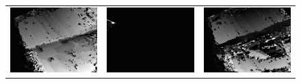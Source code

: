 \documentclass[11pt]{report}
\begin{document}
\begin{figure}[H]
\begin{tabular}{ccc}
    \includegraphics[scale=0.1]{images/disparity-opencv-t/disparity_3.png} &
    \includegraphics[scale=0.1]{images/disparity-opencv-d/disparity_3.png} &
    \includegraphics[scale=0.1]{images/disparity-opengv/disparity_3.png} \\

\end{tabular}
\end{figure}
\end{document}
